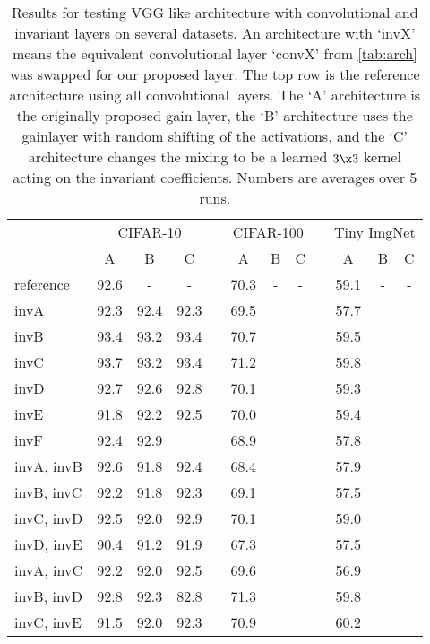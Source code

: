 \begin{table}
  \renewcommand{\arraystretch}{1.2}
  \centering
  \caption{Results for testing VGG like architecture with convolutional and
  invariant layers on several datasets. An architecture with `invX' means the
  equivalent convolutional layer `convX' from \autoref{tab:arch} was swapped for
  our proposed layer. The top row is the reference architecture using all
  convolutional layers. The `A' architecture is the originally proposed gain
  layer, the `B' architecture uses the gainlayer with random shifting of the
  activations, and the `C' architecture changes the mixing to be a learned
  $3\x3$ kernel acting on the invariant coefficients. Numbers are averages over
  5 runs.}
  \begin{tabular}{@{}lccclccclccc@{}}
    \toprule
    & \multicolumn{3}{c}{CIFAR-10} & \phantom{abc} & \multicolumn{3}{c}{CIFAR-100} & \phantom{abc} & \multicolumn{3}{c}{Tiny ImgNet} \\ \cline{2-4}\cline{6-8}\cline{10-12}
    \phantom{abc} & A  & B & C &&  A & B & C && A & B & C \\ \midrule
    reference & 92.6 & - & - && 70.3 & - & - && 59.1 & - & - \\ \midrule
    invA & 92.3 & 92.4 & 92.3 && 69.5 & & && 57.7 & &  \\
    invB & 93.4 & 93.2 & 93.4 && 70.7 & & && 59.5 & &  \\
    invC & 93.7 & 93.2 & 93.4 && 71.2 & & && 59.8 & &  \\
    invD & 92.7 & 92.6 & 92.8 && 70.1 & & && 59.3 & &  \\
    invE & 91.8 & 92.2 & 92.5 && 70.0 & & && 59.4 & &  \\
    invF & 92.4 & 92.9 & && 68.9 & & && 57.8 & &  \\
    invA, invB& 92.6 & 91.8 & 92.4 && 68.4 & &  && 57.9 & & \\
    invB, invC& 92.2 & 91.8 & 92.3 && 69.1 & & && 57.5 & & \\
    invC, invD& 92.5 & 92.0 & 92.9 && 70.1 & &  && 59.0 & & \\
    invD, invE& 90.4 & 91.2 & 91.9 && 67.3 & &  && 57.5 & & \\
    invA, invC& 92.2 & 92.0 & 92.5 && 69.6 & &  && 56.9 & & \\
    invB, invD& 92.8 & 92.3 & 82.8 && 71.3 & &  && 59.8 & & \\
    invC, invE& 91.5 & 92.0 & 92.3 && 70.9 & &  && 60.2 & & \\ \bottomrule
  \end{tabular}\label{tab:conv_results}
\end{table}


